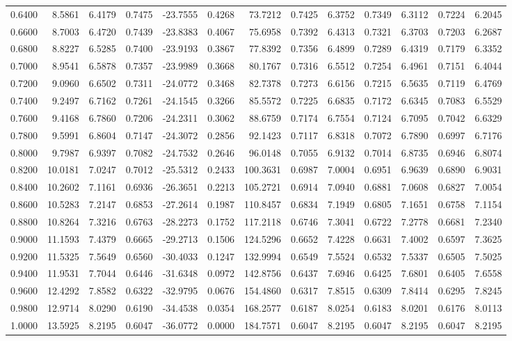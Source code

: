 \begin{tabular}{rrrrrrrrrrrrr}
0.6400 & 8.5861 & 6.4179 & 0.7475 & -23.7555 & 0.4268 & 73.7212 & 0.7425 & 6.3752 & 0.7349 & 6.3112 & 0.7224 & 6.2045 \\
0.6600 & 8.7003 & 6.4720 & 0.7439 & -23.8383 & 0.4067 & 75.6958 & 0.7392 & 6.4313 & 0.7321 & 6.3703 & 0.7203 & 6.2687 \\
0.6800 & 8.8227 & 6.5285 & 0.7400 & -23.9193 & 0.3867 & 77.8392 & 0.7356 & 6.4899 & 0.7289 & 6.4319 & 0.7179 & 6.3352 \\
0.7000 & 8.9541 & 6.5878 & 0.7357 & -23.9989 & 0.3668 & 80.1767 & 0.7316 & 6.5512 & 0.7254 & 6.4961 & 0.7151 & 6.4044 \\
0.7200 & 9.0960 & 6.6502 & 0.7311 & -24.0772 & 0.3468 & 82.7378 & 0.7273 & 6.6156 & 0.7215 & 6.5635 & 0.7119 & 6.4769 \\
0.7400 & 9.2497 & 6.7162 & 0.7261 & -24.1545 & 0.3266 & 85.5572 & 0.7225 & 6.6835 & 0.7172 & 6.6345 & 0.7083 & 6.5529 \\
0.7600 & 9.4168 & 6.7860 & 0.7206 & -24.2311 & 0.3062 & 88.6759 & 0.7174 & 6.7554 & 0.7124 & 6.7095 & 0.7042 & 6.6329 \\
0.7800 & 9.5991 & 6.8604 & 0.7147 & -24.3072 & 0.2856 & 92.1423 & 0.7117 & 6.8318 & 0.7072 & 6.7890 & 0.6997 & 6.7176 \\
0.8000 & 9.7987 & 6.9397 & 0.7082 & -24.7532 & 0.2646 & 96.0148 & 0.7055 & 6.9132 & 0.7014 & 6.8735 & 0.6946 & 6.8074 \\
0.8200 & 10.0181 & 7.0247 & 0.7012 & -25.5312 & 0.2433 & 100.3631 & 0.6987 & 7.0004 & 0.6951 & 6.9639 & 0.6890 & 6.9031 \\
0.8400 & 10.2602 & 7.1161 & 0.6936 & -26.3651 & 0.2213 & 105.2721 & 0.6914 & 7.0940 & 0.6881 & 7.0608 & 0.6827 & 7.0054 \\
0.8600 & 10.5283 & 7.2147 & 0.6853 & -27.2614 & 0.1987 & 110.8457 & 0.6834 & 7.1949 & 0.6805 & 7.1651 & 0.6758 & 7.1154 \\
0.8800 & 10.8264 & 7.3216 & 0.6763 & -28.2273 & 0.1752 & 117.2118 & 0.6746 & 7.3041 & 0.6722 & 7.2778 & 0.6681 & 7.2340 \\
0.9000 & 11.1593 & 7.4379 & 0.6665 & -29.2713 & 0.1506 & 124.5296 & 0.6652 & 7.4228 & 0.6631 & 7.4002 & 0.6597 & 7.3625 \\
0.9200 & 11.5325 & 7.5649 & 0.6560 & -30.4033 & 0.1247 & 132.9994 & 0.6549 & 7.5524 & 0.6532 & 7.5337 & 0.6505 & 7.5025 \\
0.9400 & 11.9531 & 7.7044 & 0.6446 & -31.6348 & 0.0972 & 142.8756 & 0.6437 & 7.6946 & 0.6425 & 7.6801 & 0.6405 & 7.6558 \\
0.9600 & 12.4292 & 7.8582 & 0.6322 & -32.9795 & 0.0676 & 154.4860 & 0.6317 & 7.8515 & 0.6309 & 7.8414 & 0.6295 & 7.8245 \\
0.9800 & 12.9714 & 8.0290 & 0.6190 & -34.4538 & 0.0354 & 168.2577 & 0.6187 & 8.0254 & 0.6183 & 8.0201 & 0.6176 & 8.0113 \\
1.0000 & 13.5925 & 8.2195 & 0.6047 & -36.0772 & 0.0000 & 184.7571 & 0.6047 & 8.2195 & 0.6047 & 8.2195 & 0.6047 & 8.2195 \\
\bottomrule
\end{tabular}
